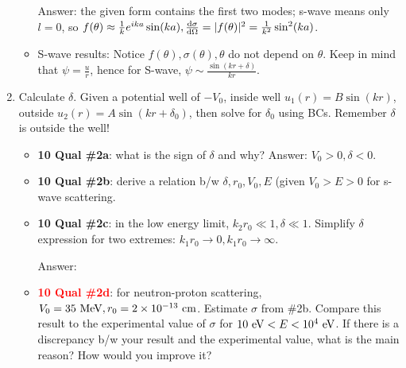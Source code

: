 \documentclass{school-22.101-notes}
\begin{document}
\begin{enumerate}
\begin{itemize}
Answer: the given form contains the first two modes; s-wave means only $l=0$, so $f(\theta) \approx \frac{1}{k} e^{ika} \sin (ka), \frac{\mathrm{d}\sigma}{\mathrm{d}\Omega} = |f(\theta)|^2 = \frac{1}{k^2} \sin^2 (ka)$. 

  \item S-wave results: 
Notice $f(\theta), \sigma (\theta), \theta$ do not depend on $\theta$. Keep in mind that $\psi = \frac{u}{r}$, hence for S-wave, $\psi \sim \frac{\sin (kr + \delta)}{kr}$.
  \end{itemize}
%
\item Calculate $\delta$. Given a potential well of $-V_0$, inside well $u_1 (r) = B \sin (kr)$, outside $u_2(r) = A \sin(kr + \delta_0)$, then solve for $\delta_0$ using BCs. Remember $\delta$ is outside the well! 
  \begin{itemize}
    \item \textbf{10 Qual \#2a}: what is the sign of $\delta$ and why? Answer: $V_0>0,  \delta < 0$. 
    \item \textbf{10 Qual \#2b}: derive a relation b/w $\delta, r_0, V_0, E$ (given $V_0 > E > 0$ for s-wave scattering. 

    \item \textbf{10 Qual \#2c}: in the low energy limit, $k_2 r_0 \ll 1, \delta \ll 1$. Simplify $\delta$ expression for two extremes: $k_1 r_0 \to 0, k_1 r_0 \to \infty$. 

      Answer: 

    \item \textcolor{red}{\textbf{10 Qual \#2d}}: for neutron-proton scattering, $V_0 = 35 \mbox{ } \mathrm{MeV}, r_0 = 2\times 10^{-13}\mbox{ } \mathrm{cm}$. Estimate $\sigma$ from \#2b. Compare this result to the experimental value of $\sigma$ for $10 \mbox{ } \mathrm{eV} < E < 10^4 \mbox{ } \mathrm{eV}$. If there is a discrepancy b/w your result and the experimental value, what is the main reason? How would you improve it? 
  \end{itemize}


\end{enumerate}
\end{document}
